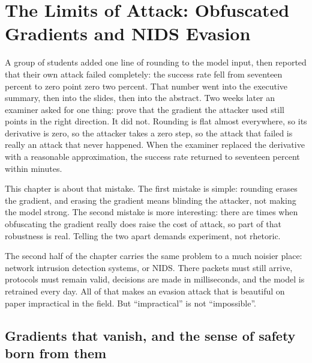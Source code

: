 \chapter{The Limits of Attack: Obfuscated Gradients and NIDS Evasion}

A group of students added one line of rounding to the model input, then reported that their own
attack failed completely: the success rate fell from seventeen percent to zero point zero two
percent. That number went into the executive summary, then into the slides, then into the abstract.
Two weeks later an examiner asked for one thing: prove that the gradient the attacker used still
points in the right direction. It did not. Rounding is flat almost everywhere, so its derivative is
zero, so the attacker takes a zero step, so the attack that failed is really an attack that never
happened. When the examiner replaced the derivative with a reasonable approximation, the success
rate returned to seventeen percent within minutes.

This chapter is about that mistake. The first mistake is simple: rounding erases the gradient, and
erasing the gradient means blinding the attacker, not making the model strong. The second mistake is
more interesting: there are times when obfuscating the gradient really does raise the cost of
attack, so part of that robustness is real. Telling the two apart demands experiment, not rhetoric.

The second half of the chapter carries the same problem to a much noisier place: network intrusion
detection systems, or NIDS. There packets must still arrive, protocols must remain valid, decisions
are made in milliseconds, and the model is retrained every day. All of that makes an evasion attack
that is beautiful on paper impractical in the field. But ``impractical'' is not ``impossible''.

\section{Gradients that vanish, and the sense of safety born from them}

